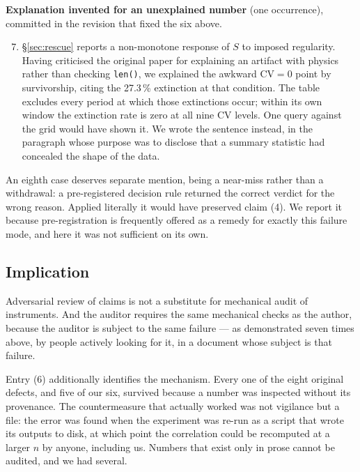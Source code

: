 \documentclass[11pt,letterpaper]{article}
\begin{document}
\textbf{Explanation invented for an unexplained number} (one
occurrence), committed in the revision that fixed the six above.
\begin{enumerate}\setcounter{enumi}{6}
\item \S\ref{sec:rescue} reports a non-monotone response of $S$ to
      imposed regularity. Having criticised the original paper for
      explaining an artifact with physics rather than checking
      \texttt{len()}, we explained the awkward $\mathrm{CV} = 0$ point
      by survivorship, citing the 27.3\,\% extinction at that
      condition. The table excludes every period at which those
      extinctions occur; within its own window the extinction rate is
      zero at all nine $\mathrm{CV}$ levels. One query against the grid
      would have shown it. We wrote the sentence instead, in the
      paragraph whose purpose was to disclose that a summary statistic
      had concealed the shape of the data.
\end{enumerate}

An eighth case deserves separate mention, being a near-miss rather than
a withdrawal: a pre-registered decision rule returned the correct
verdict for the wrong reason. Applied literally it would have preserved
claim (4). We report it because pre-registration is frequently offered
as a remedy for exactly this failure mode, and here it was not
sufficient on its own.

\subsection{Implication}

Adversarial review of claims is not a substitute for mechanical audit of
instruments. And the auditor requires the same mechanical checks as the
author, because the auditor is subject to the same failure --- as
demonstrated seven times above, by people actively looking for it, in a
document whose subject is that failure.

Entry (6) additionally identifies the mechanism. Every one of the eight
original defects, and five of our six, survived because a number was
inspected without its provenance. The countermeasure that actually
worked was not vigilance but a file: the error was found when the
experiment was re-run as a script that wrote its outputs to disk, at
which point the correlation could be recomputed at a larger $n$ by
anyone, including us. Numbers that exist only in prose cannot be
audited, and we had
several.
\end{document}
